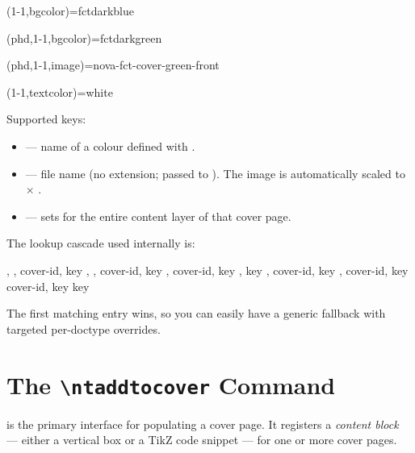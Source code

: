 \begin{latexcode}
\SetThesisCover*(1-1,bgcolor)={fctdarkblue}

\SetThesisCover*(phd,1-1,bgcolor)={fctdarkgreen}

\SetThesisCover*(phd,1-1,image)={nova-fct-cover-green-front}

\SetThesisCover*(1-1,textcolor)={white}
\end{latexcode}

Supported keys:
\begin{itemize}
  \item {} — name of a colour defined with \latexinline{\definecolor}.
  \item {} — file name (no extension; passed to
        ).  The image is automatically scaled to
        \latexinline{\paperwidth} $\times$ \latexinline{\paperheight}.
  \item {} — sets \latexinline{\color{...}} for the entire content
        layer of that cover page.
\end{itemize}

The lookup cascade used internally is:
\begin{latexcode}
\@DOCTYPE, \@DEGREEACR, cover-id, key
\@DOCCLASS, \@DEGREEACR, cover-id, key
\@DEGREEACR, cover-id, key
\@DEGREEACR, key
\@DOCTYPE, cover-id, key
\@DOCCLASS, cover-id, key
cover-id, key
key
\end{latexcode}

The first matching entry wins, so you can easily have a generic fallback with
targeted per-doctype overrides.


\section{The \texttt{\textbackslash ntaddtocover} Command}
\label{sec:ntaddtocover}

\latexinline{\ntaddtocover} is the primary interface for populating a cover page.
It registers a \emph{content block} — either a vertical box or a TikZ code
snippet — for one or more cover pages.

